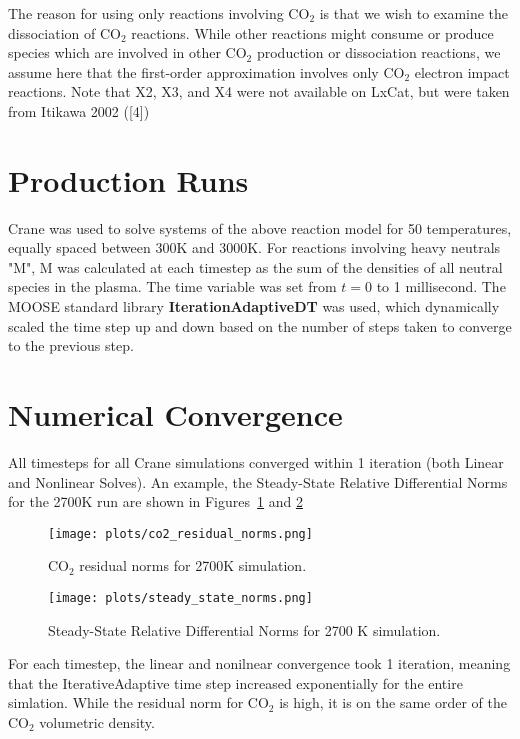 \documentclass[twocolumn,10pt,a4paper]{article}
\begin{document}
The reason for using only reactions involving CO$_2$ is that we wish to examine
the dissociation of CO$_2$ reactions. While other reactions might consume
or produce species which are involved in other CO$_2$ production or dissociation
reactions, we assume here that the first-order approximation involves only
CO$_2$ electron impact reactions. Note that X2, X3, and X4 were not available
on LxCat, but were taken from Itikawa 2002 ([4])

\section{Production Runs}
Crane was used to solve systems of the above reaction model for 50 temperatures,
equally spaced between 300K and 3000K. For reactions involving heavy neutrals "M", M was calculated at
each timestep as the sum of the densities of all neutral species in the plasma. The time variable was set from $t=0$ to 1 millisecond.
The MOOSE standard library \textbf{IterationAdaptiveDT} was
used, which dynamically scaled the time step up and down based
on the number of steps taken to converge to the previous step.

\section{Numerical Convergence}
All timesteps for all Crane simulations converged within 1
iteration (both Linear and Nonlinear Solves). An example,
the Steady-State Relative Differential Norms for the 2700K run
are shown in Figures~\ref{fig: co2norms} and \ref{fig: ssnorms}
\begin{figure}[htbp]
\centering
\texttt{[image: plots/co2\_residual\_norms.png]}
\caption{CO$_2$ residual norms for 2700K simulation.}
\label{fig: co2norms}
\end{figure}


\begin{figure}[htbp]
\centering
        \texttt{[image: plots/steady\_state\_norms.png]}
       \caption{Steady-State Relative Differential Norms for 2700 K simulation.}
        \label{fig: ssnorms}
\end{figure}

For each timestep, the linear and nonilnear convergence took 1 iteration, meaning that the IterativeAdaptive
time step increased exponentially for the entire simlation. While the residual norm for CO$_2$ is high,
it is on the same order of the CO$_2$ volumetric density.
\end{document}
